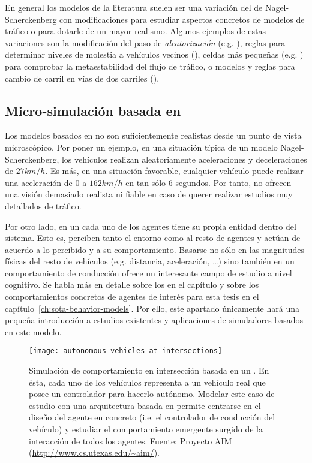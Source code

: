 En general los modelos de la literatura suelen ser una variación del de Nagel-Scherckenberg con modificaciones para estudiar aspectos concretos de modelos de tráfico o para dotarle de un mayor realismo. Algunos ejemplos de estas variaciones son la modificación del paso de \textit{aleatorización} (e.g. \cite{Barlovic1998}), reglas para determinar niveles de molestia a vehículos vecinos (\cite{Wagner1997}), celdas más pequeñas (e.g. \cite{Krauss1997}) para comprobar la metaestabilidad del flujo de tráfico, o modelos y reglas para cambio de carril en vías de dos carriles (\cite{Brilon1999, Nagel1998}).

\subsection{Micro-simulación basada en }

Los modelos basados en  no son suficientemente realistas desde un punto de vista microscópico. Por poner un ejemplo, en una situación típica de un modelo Nagel-Scherckenberg, los vehículos realizan aleatoriamente aceleraciones y deceleraciones de $27 km/h$. Es más, en una situación favorable, cualquier vehículo puede realizar una aceleración de $0$ a $162km/h$ en tan sólo $6$ segundos. Por tanto, no ofrecen una visión demasiado realista ni fiable en caso de querer realizar estudios muy detallados de tráfico.

Por otro lado, en un  cada uno de los agentes tiene su propia entidad dentro del sistema. Esto es, perciben tanto el entorno como al resto de agentes y actúan de acuerdo a lo percibido y a su comportamiento. Basarse no sólo en las magnitudes físicas del resto de vehículos (e.g. distancia, aceleración, \ldots) sino también en un comportamiento de conducción ofrece un interesante campo de estudio a nivel cognitivo. Se habla más en detalle sobre los  en el capítulo  y sobre los comportamientos concretos de agentes de interés para esta tesis en el capítulo~\ref{ch:sota-behavior-models}. Por ello, este apartado únicamente hará una pequeña introducción a estudios existentes y aplicaciones de simuladores basados en este modelo.

\begin{figure}[t]
	\centering
	\texttt{[image: autonomous-vehicles-at-intersections]}
	\caption[Simulación de comportamiento en intersección basada en un ]{Simulación de comportamiento en intersección basada en un . En ésta, cada uno de los vehículos representa a un vehículo real que posee un controlador para hacerlo autónomo. Modelar este caso de estudio con una arquitectura basada en  permite centrarse en el diseño del agente en concreto (i.e. el controlador de conducción del vehículo) y estudiar el comportamiento emergente surgido de la interacción de todos los agentes. Fuente: Proyecto AIM (\url{http://www.cs.utexas.edu/~aim/}).}
	\label{fig:autonomous-vehicles-at-intersections}
\end{figure}

